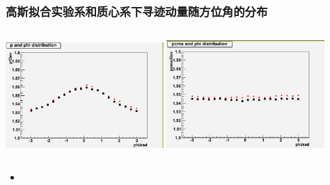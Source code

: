 \documentclass{beamer}
\begin{document}
\begin{frame}
    \frametitle{高斯拟合实验系和质心系下寻迹动量随方位角的分布}
    \begin{columns}
        \column{6.0cm}
        \includegraphics[width=6cm, keepaspectratio]{data/p_phi.png}
        \column{6.0cm}
        \includegraphics[width=6cm, keepaspectratio]{data/pcms_phi0.png}
    \end{columns}
    \begin{itemize}
        \item 
    \end{itemize}

\end{frame}
\end{document}
